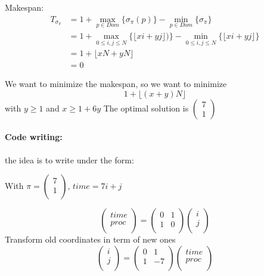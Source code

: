 \documentclass{article}
\begin{document}
Makespan: 
\begin{align*}
T_{\sigma_\pi} &= 1 + \max_{p\in Dom} \{ \sigma_\pi (p)\} - \min_{p \in Dom} \{\sigma_\pi\}\\
&= 1 + \max_{0\leq i,j \leq N} \{ \lfloor xi+yj \rfloor)\} - \min_{0\leq i,j \leq N} \{\lfloor xi+yj \rfloor\}\\
&= 1 + \lfloor xN+yN\rfloor\\
&=0
\end{align*}

We want to minimize the makespan, so we want to minimize
\[ 1 + \lfloor (x+y)N\rfloor \] with $y\geq 1$ and $x\geq 1 + 6y$
The optimal solution is $\begin{pmatrix}
7\\1
\end{pmatrix}$

\paragraph{Code writing:}the idea is to write under the form:
\begin{algorithm}
\end{algorithm}

With $\pi =\begin{pmatrix}
7\\1\\
\end{pmatrix}$, $time=7i+j$

\[\begin{pmatrix}
time\\
proc\\
\end{pmatrix}
=
\begin{pmatrix}
0&1\\1&0\\
\end{pmatrix}
\begin{pmatrix}
i\\j\\
\end{pmatrix}
\]
Transform old coordinates in term of new ones
\[
\begin{pmatrix}
i\\j\\
\end{pmatrix}
=
\begin{pmatrix}
0&1\\
1&-7\\
\end{pmatrix}
\begin{pmatrix}
time\\
proc\\
\end{pmatrix}
\]
\end{document}
